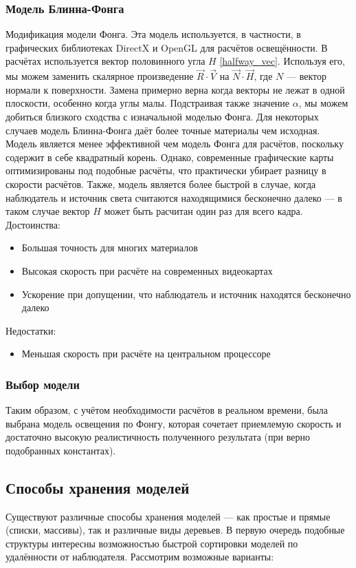 \documentclass[a4paper,12pt]{report}
\numberwithin{equation}{section}
\begin{document}
\subsubsection*{Модель Блинна-Фонга}
Модификация модели Фонга. Эта модель \cite{blinnphongmodel} используется, в частности, в графических библиотеках DirectX и OpenGL для расчётов освещённости. В расчётах используется вектор половинного угла $H$ \eqref{halfway_vec}. Используя его, мы можем заменить скалярное произведение $\vec{R} \cdot \vec{V}$ на $\vec{N} \cdot \vec{H}$, где $N$ --- вектор нормали к поверхности. Замена примерно верна когда векторы не лежат в одной плоскости, особенно когда углы малы. Подстраивая также значение $\alpha$, мы можем добиться близкого сходства с изначальной моделью Фонга. Для некоторых случаев модель Блинна-Фонга даёт более точные материалы чем исходная. \\
Модель является менее эффективной чем модель Фонга для расчётов, поскольку содержит в себе квадратный корень. Однако, современные графические карты оптимизированы под подобные расчёты, что практически убирает разницу в скорости расчётов. Также, модель является более быстрой в случае, когда наблюдатель и источник света считаются находящимися бесконечно далеко --- в таком случае вектор $H$ может быть расчитан один раз для всего кадра. \\
Достоинства:
\begin{itemize}
\item Большая точность для многих материалов
\item Высокая скорость при расчёте на современных видеокартах
\item Ускорение при допущении, что наблюдатель и источник находятся бесконечно далеко
\end{itemize}
Недостатки:
\begin{itemize}
\item Меньшая скорость при расчёте на центральном процессоре
\end{itemize}

\subsubsection*{Выбор модели}
Таким образом, с учётом необходимости расчётов в реальном времени, была выбрана модель освещения по Фонгу, которая сочетает приемлемую скорость и достаточно высокую реалистичность полученного результата (при верно подобранных константах).

\subsection{Способы хранения моделей}
Существуют различные способы хранения моделей --- как простые и прямые (списки, массивы), так и различные виды деревьев. В первую очередь подобные структуры интересны возможностью быстрой сортировки моделей по удалённости от наблюдателя. Рассмотрим возможные варианты:
\end{document}
